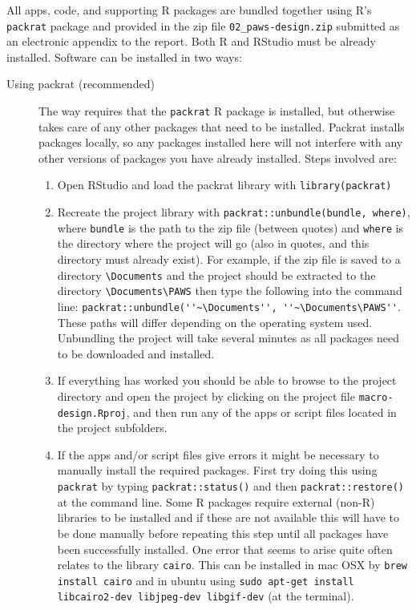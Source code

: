 \documentclass[a4paper,11pt, draft]{article} %
\begin{document}
All apps, code, and supporting R packages are bundled together using R's \texttt{packrat} package and provided in the zip file \verb!02_paws-design.zip! submitted as an electronic appendix to the report. Both R and RStudio must be already installed. Software can be installed in two ways:
\begin{description}
\item[Using packrat (recommended)] The way requires that the \texttt{packrat} R package is installed, but otherwise takes care of any other packages that need to be installed. Packrat installs packages locally, so any packages installed here will not interfere with any other versions of packages you have already installed. Steps involved are:
\begin{enumerate}
\item Open RStudio and load the packrat library with \verb!library(packrat)!
\item Recreate the project library with \verb!packrat::unbundle(bundle, where)!, where \texttt{bundle} is the path to the zip file (between quotes) and \texttt{where} is the directory where the project will go (also in quotes, and this directory must already exist). For example, if the zip file is saved to a directory \verb!\Documents! and the project should be extracted to the directory \verb!\Documents\PAWS! then type the following into the command line: \verb!packrat::unbundle(''~\Documents'', ''~\Documents\PAWS''!. These paths will differ depending on the operating system used. Unbundling the project will take several minutes as all packages need to be downloaded and installed.  
\item If everything has worked you should be able to browse to the project directory and open the project by clicking on the project file \texttt{macro-design.Rproj}, and then run any of the apps or script files located in the project subfolders. 
\item If the apps and/or script files give errors it might be necessary to manually install the required packages. First try doing this using \texttt{packrat} by typing \verb!packrat::status()! and then \verb!packrat::restore()! at the command line. Some R packages require external (non-R) libraries to be installed and if these are not available this will have to be done manually before repeating this step until all packages have been successfully installed. One error that seems to arise quite often relates to the library \verb!cairo!. This can be installed in mac OSX by \verb!brew install cairo! and in ubuntu using \verb!sudo apt-get install libcairo2-dev libjpeg-dev libgif-dev! (at the terminal).

\end{enumerate}
\end{description}
\end{document}
